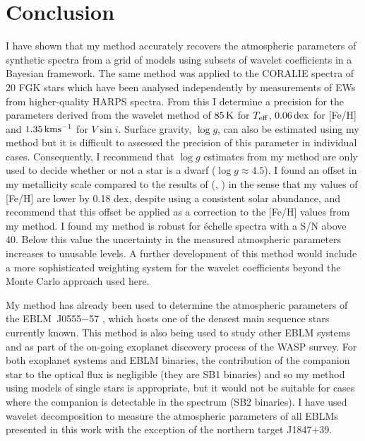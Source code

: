 \section{Conclusion} \label{Conclusion}

I have shown that my method accurately recovers the atmospheric parameters of synthetic spectra from a grid of models using subsets of wavelet coefficients in a Bayesian framework. The same method was applied to the CORALIE spectra of 20 FGK stars which have been analysed independently by measurements of EWs from higher-quality HARPS spectra. From this I determine a precision for the parameters derived from the wavelet method of $85\, \rm K$ for $T_{\rm eff}$, $0.06\, \rm dex$ for [Fe/H] and $1.35\,  \rm kms^{-1}$ for $V \sin i$. Surface gravity, $\log g$, can also be estimated using my method but it is difficult to assessed the precision of this parameter in individual cases. Consequently, I recommend that $\log g$ estimates from my method are only used to decide whether or not a star is a dwarf ($\log g \approx 4.5$). I found an offset in my metallicity scale compared to the results of (\citealt{Doyle2013}, \citealt{Doyle2015}) in the sense that my values of [Fe/H] are lower by 0.18 dex, despite using a consistent solar abundance, and recommend that this offset be applied as a correction to the [Fe/H] values from my method. I found my method is robust for \'{e}chelle spectra with a S/N above 40. Below this value the uncertainty in the measured atmospheric parameters increases to unusable levels. A further development of this method would include a more sophisticated weighting system for the wavelet coefficients beyond the Monte Carlo approach used here. 

My method has already been used to determine the atmospheric parameters of the EBLM~J0555$-$57 \citep{vonBoetticher2017},  which hosts one of the densest main sequence stars currently known. This method is also being used to study other EBLM systems and as part of the on-going exoplanet discovery process of the  WASP survey. For both exoplanet systems and EBLM binaries, the contribution of the companion star to the optical flux is negligible (they are SB1 binaries) and so my method using models of single stars is appropriate, but it would not be suitable for cases where the companion is detectable in the spectrum (SB2 binaries).  I have used wavelet decomposition to measure the atmospheric parameters of all EBLMs presented in this work with the exception of the northern target J1847$+$39. 









